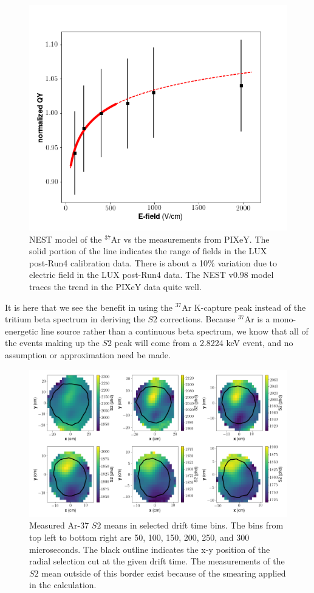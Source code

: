 {\begin{figure}[h!]
\centering
\includegraphics[width=150mm]{Figures/pixey_Ar_v_ef.png}
\caption{NEST model of the $^{37}$Ar vs the measurements from PIXeY\cite{pixey_ar37}. The solid portion of the line indicates the range of fields in the LUX post-Run4 calibration data. There is about a 10\% variation due to electric field in the LUX post-Run4 data. The NEST v0.98 model traces the trend in the PIXeY data quite well.}
\label{fig:pixey_Ar_v_ef} 
\end{figure}
It is here that we see the benefit in using the $^{37}$Ar K-capture peak instead of the tritium beta spectrum in deriving the $S2$ corrections. Because $^{37}$Ar is a mono-energetic line source rather than a continuous beta spectrum, we know that all of the events making up the $S2$ peak will come from a 2.8224 keV event, and no assumption or approximation need be made. 
\begin{figure}[h!]
\centering
\includegraphics[width=150mm]{Figures/S2map_xy.png}
\caption{Measured Ar-37 $S2$ means in selected drift time bins. The bins from top left to bottom right are 50, 100, 150, 200, 250, and 300 microseconds. The black outline indicates the x-y position of the radial selection cut at the given drift time. The measurements of the $S2$ mean outside of this border exist because of the smearing applied in the calculation. }
\label{fig:S2map_xy} 
\end{figure}

}
